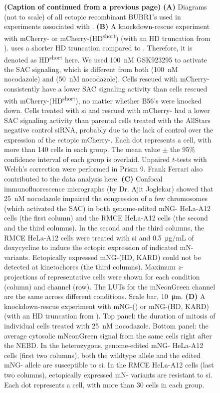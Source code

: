 \begin{figure} [t!]
  \noindent\justifying \textbf{(Caption of  continued from a previous page)} \textbf{(A)} Diagrams (not to scale) of all ectopic recombinant BUBR1's used in experiments associated with . \textbf{(B)} A  knockdown-rescue experiment with mCherry- or mCherry-(\textDelta{}HD\textsuperscript{short}) (with an HD truncation from \cite{BubR1TwoPools}). \cite{BubR1TwoPools} uses a shorter HD truncation compared to \cite{BubBiochem}. Therefore, it is denoted as \textDelta{}HD\textsuperscript{short} here. We used \SI{100}{nM} GSK923295 to activate the SAC signaling, which is different from both \cite{BubR1TwoPools} (\SI{100}{nM} nocodazole) and \cite{BubBiochem} (\SI{50}{nM} nocodazole). Cells rescued with mCherry- consistently have a lower SAC signaling activity than cells rescued with mCherry-(\textDelta{}HD\textsuperscript{short}), no matter whether B56's were knocked down. Cells treated with si and rescued with mCherry- had a lower SAC signaling activity than parental cells treated with the AllStars negative control siRNA, probably due to the lack of control over the expression of the ectopic mCherry-. Each dot represents a cell, with more than 140 cells in each group. The mean value $\pm$ the 95\% confidence interval of each group is overlaid. Unpaired $t$-tests with Welch's correction were performed in Prism 9. Frank Ferrari also contributed to the data analysis here. \textbf{(C)} Confocal immunofluorescence micrographs (by Dr. Ajit Joglekar) showed that \SI{25}{nM} nocodazole impaired the congression of a few chromosomes (which activated the SAC) in both genome-edited mNG- HeLa-A12 cells (the first column) and the RMCE HeLa-A12 cells (the second and the third columns). In the second and the third columns, the RMCE HeLa-A12 cells were treated with si and \SI{0.5}{\micro g/mL} of doxycycline to induce the ectopic expression of indicated mN- variants. Ectopically expressed mNG-(\textDelta{}HD, \textDelta{}KARD) could not be detected at kinetochores (the third columns). Maximum $z$-projections of representative cells were shown for each condition (column) and channel (row). The LUTs for the mNeonGreen channel are the same across different conditions. Scale bar, \SI{10}{\micro m}. \textbf{(D)} A  knockdown-rescue experiment with mNG-() or mNG-(\textDelta{}HD, \textDelta{}KARD) (with an HD truncation from \cite{BubBiochem}). Top panel: the duration of mitosis of individual cells treated with \SI{25}{nM} nocodazole. Bottom panel: the average cytosolic mNeonGreen signal from the same cells right after the NEBD. In the heterozygous, genome-edited mNG- HeLa-A12 cells (first two columns), both the wildtype allele and the edited mNG- allele are susceptible to si. In the RMCE HeLa-A12 cells (last two columns), ectopically expressed mN- variants are resistant to si. Each dot represents a cell, with more than 30 cells in each group. 
\end{figure}

